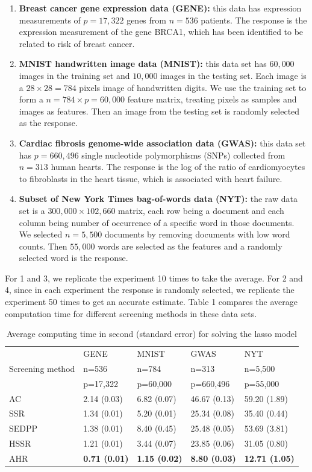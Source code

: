 \begin{enumerate}
    \item \textbf{Breast cancer gene expression data
(GENE):} this data has expression measurements of $p=17,322$ genes from $n=536$ patients. The response is the expression measurement of the gene BRCA1, which has been identified to be related to risk of breast cancer.
    \item \textbf{MNIST handwritten image data
(MNIST):} this data set has $60,000$ images in the training set and $10,000$ images in the testing set. Each image is a $28\times 28=784$ pixels image of handwritten digits. We use the training set to form a $n=784\times p=60,000$ feature matrix, treating pixels as samples and images as features. Then an image from the testing set is randomly selected as the response.
    \item \textbf{ Cardiac fibrosis genome-wide association data
(GWAS):} this data set has $p=660,496$ single nucleotide
polymorphisms (SNPs) collected from $n=313$ human hearts. The response is the log of the ratio of cardiomyocytes to fibroblasts in the heart tissue, which is associated with heart failure.
    \item \textbf{Subset of New York Times bag-of-words data
(NYT):} the raw data set is a $300,000\times 102,660$ matrix, each row being a document and each column being number of occurrence of a specific word in those documents. We selected $n=5,500$ documents by removing documents with low word counts. Then $55,000$ words are selected as the features and a randomly selected word is the response.

\end{enumerate}


For 1 and 3, we replicate the experiment 10 times to take the average. For 2 and 4, since in each experiment the response is randomly selected, we replicate the experiment 50 times to get an accurate estimate. Table 1 compares the average computation time for different screening methods in these data sets.

\begin{table}[H]
\centering
\begin{tabular}{l|l|l|l|l}
\hline
 & GENE & MNIST & GWAS & NYT \\
Screening method & n=536 & n=784 & n=313 & n=5,500 \\
 & p=17,322 & p=60,000 & p=660,496 & p=55,000 \\ \hline
AC & 2.14 (0.03) & 6.82 (0.07) & 46.67 (0.13) & 59.20 (1.89) \\
SSR & 1.34 (0.01) & 5.20 (0.01) & 25.34 (0.08) & 35.40 (0.44) \\
SEDPP & 1.38 (0.01) & 8.40 (0.45) & 25.48 (0.05) & 53.69 (3.81) \\
HSSR & 1.21 (0.01) & 3.44 (0.07) & 23.85 (0.06) & 31.05 (0.80) \\
AHR & \textbf{0.71 (0.01)} & \textbf{1.15 (0.02)} & \textbf{8.80 (0.03)} & \textbf{12.71 (1.05)} \\\hline
\end{tabular}
\caption{Average computing time in second (standard error) for solving the lasso model}
\end{table}

